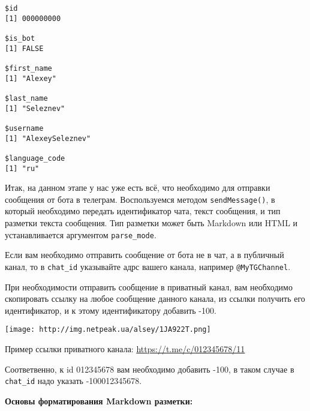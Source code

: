 \documentclass[
]{book}
\newenvironment{Shaded}{\begin{snugshade}}{\end{snugshade}}
\newcommand{\AttributeTok}[1]{\textcolor[rgb]{0.77,0.63,0.00}{#1}}
\newcommand{\CommentTok}[1]{\textcolor[rgb]{0.56,0.35,0.01}{\textit{#1}}}
\newcommand{\FunctionTok}[1]{\textcolor[rgb]{0.00,0.00,0.00}{#1}}
\newcommand{\NormalTok}[1]{#1}
\newcommand{\SpecialCharTok}[1]{\textcolor[rgb]{0.00,0.00,0.00}{#1}}
\newcommand{\StringTok}[1]{\textcolor[rgb]{0.31,0.60,0.02}{#1}}
\begin{document}
\begin{verbatim}
$id
[1] 000000000

$is_bot
[1] FALSE

$first_name
[1] "Alexey"

$last_name
[1] "Seleznev"

$username
[1] "AlexeySeleznev"

$language_code
[1] "ru"
\end{verbatim}

Итак, на данном этапе у нас уже есть всё, что необходимо для отправки сообщения от бота в телеграм. Воспользуемся методом \texttt{sendMessage()}, в который необходимо передать идентификатор чата, текст сообщения, и тип разметки текста сообщения. Тип разметки может быть Markdown или HTML и устанавливается аргументом \texttt{parse\_mode}.

\begin{Shaded}
\end{Shaded}

Если вам необходимо отправить сообщение от бота не в чат, а в публичный канал, то в \texttt{chat\_id} указывайте адрс вашего канала, например \texttt{\textquotesingle{}@MyTGChannel\textquotesingle{}}.

При необходимости отправить сообщение в приватный канал, вам необходимо скопировать ссылку на любое сообщение данного канала, из ссылки получить его идентификатор, и к этому идентификатору добавить -100.

\texttt{[image: http://img.netpeak.ua/alsey/1JA922T.png]}

Пример ссылки приватного канала: \url{https://t.me/c/012345678/11}

Соответвенно, к id 012345678 вам необходимо добавить -100, в таком случае в \texttt{chat\_id} надо указать -100012345678.

\textbf{Основы форматирования Markdown разметки:}
\end{document}
